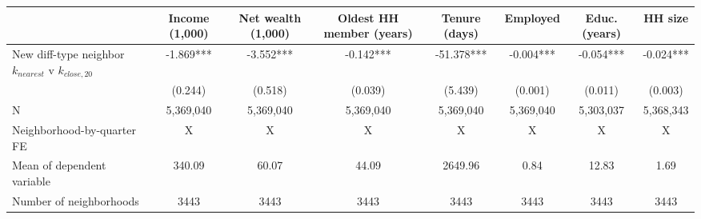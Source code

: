 \begin{tabular}[t]{lccccccc}
\toprule
  & Income (1,000) & Net wealth (1,000) & Oldest HH member (years) & Tenure (days) & Employed & Educ. (years) & HH size\\
\midrule
New diff-type neighbor $k_{nearest}$ v $k_{close,20}$ & -1.869*** & -3.552*** & -0.142*** & -51.378*** & -0.004*** & -0.054*** & -0.024***\\
 & (0.244) & (0.518) & (0.039) & (5.439) & (0.001) & (0.011) & (0.003)\\
\midrule
N & 5,369,040 & 5,369,040 & 5,369,040 & 5,369,040 & 5,369,040 & 5,303,037 & 5,368,343\\
Neighborhood-by-quarter FE & X & X & X & X & X & X & X\\
Mean of dependent variable & 340.09 & 60.07 & 44.09 & 2649.96 & 0.84 & 12.83 & 1.69\\
Number of neighborhoods & 3443 & 3443 & 3443 & 3443 & 3443 & 3443 & 3443\\
\bottomrule
\end{tabular}